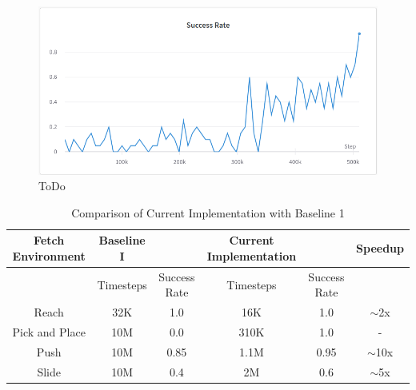 \begin{figure}[h!]
    \centering
    \includegraphics[width=\textwidth]{images/FPAPSSR.png}
    \caption{ToDo}
    \label{fig:HER}
\end{figure}

\begin{table}[h!]
\begin{tabular}{|c|cc|cc|c|}
\hline
Fetch Environment & Baseline I               &      & Current Implementation    &      & Speedup   \\ \hline
 & \multicolumn{1}{c|}{Timesteps} & Success Rate & \multicolumn{1}{c|}{Timesteps} & Success Rate &  \\ \hline
Reach             & \multicolumn{1}{c|}{32K} & 1.0  & \multicolumn{1}{c|}{16K}  & 1.0  & $\sim$2x  \\ \hline
Pick and Place    & \multicolumn{1}{c|}{10M} & 0.0  & \multicolumn{1}{c|}{310K} & 1.0  & -         \\ \hline
Push              & \multicolumn{1}{c|}{10M} & 0.85 & \multicolumn{1}{c|}{1.1M} & 0.95 & $\sim$10x \\ \hline
Slide             & \multicolumn{1}{c|}{10M} & 0.4  & \multicolumn{1}{c|}{2M}   & 0.6  & $\sim$5x  \\ \hline
\end{tabular}
\caption{Comparison of Current Implementation with Baseline 1}
\label{tab:my-table1}
\end{table}

